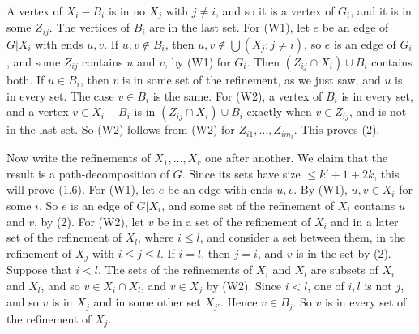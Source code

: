{A vertex of $X_i-B_i$ is in no $X_j$ with $j\ne i$, and so it is a vertex of $G_i$, and it is in
some $Z_{ij}$. The vertices of $B_i$ are in the last set. For (W1), let $e$ be an edge of $G|X_i$
with ends $u,v$. If $u,v\notin B_i$, then $u,v\notin\bigcup(X_j\colon j\ne i)$, so $e$ is an edge of
$G_i$, and some $Z_{ij}$ contains $u$ and $v$, by (W1) for $G_i$. Then $(Z_{ij}\cap X_i)\cup B_i$
contains both. If $u\in B_i$, then $v$ is in some set of the refinement, as we just saw, and $u$
is in every set. The case $v\in B_i$ is the same. For (W2), a vertex of $B_i$ is in every set, and a
vertex $v\in X_i-B_i$ is in $(Z_{ij}\cap X_i)\cup B_i$ exactly when $v\in Z_{ij}$, and is not in the
last set. So (W2) follows from (W2) for $Z_{i1},\dots,Z_{im_i}$. This proves (2).

Now write the refinements of $X_1,\dots,X_r$ one after another. We claim that the result is a
path-decomposition of $G$. Since its sets have size $\le k'+1+2k$, this will prove (1.6). For
(W1), let $e$ be an edge with ends $u,v$. By (W1), $u,v\in X_i$ for some $i$. So $e$ is an edge of
$G|X_i$, and some set of the refinement of $X_i$ contains $u$ and $v$, by (2). For (W2), let $v$ be
in a set of the refinement of $X_i$ and in a later set of the refinement of $X_l$, where $i\le l$,
and consider a set between them, in the refinement of $X_j$ with $i\le j\le l$. If $i=l$, then
$j=i$, and $v$ is in the set by (2). Suppose that $i<l$. The sets of the refinements of $X_i$ and
$X_l$ are subsets of $X_i$ and $X_l$, and so $v\in X_i\cap X_l$, and $v\in X_j$ by (W2). Since $i<l$,
one of $i,l$ is not $j$, and so $v$ is in $X_j$ and in some other set $X_{j'}$. Hence $v\in B_j$. So $v$ is in every
set of the refinement of $X_j$.}
